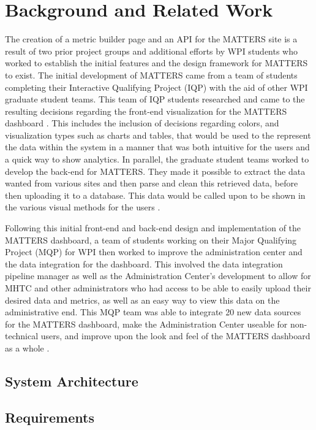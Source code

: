\chapter{Background and Related Work}

The creation of a metric builder page and an API for the MATTERS site is a result of two prior project groups and additional efforts by WPI students who worked to establish the initial features and the design framework for MATTERS to exist. The initial development of MATTERS came from a team of students completing their Interactive Qualifying Project (IQP) with the aid of other WPI graduate student teams. This team of IQP students researched and came to the resulting decisions regarding the front-end visualization for the MATTERS dashboard \cite{prevreport}. This includes the inclusion of decisions regarding colors, and visualization types such as charts and tables, that would be used to the represent the data within the system in a manner that was both intuitive for the users and a quick way to show analytics. In parallel, the graduate student teams worked to develop the back-end for MATTERS. They made it possible to extract the data wanted from various sites and then parse and clean this retrieved data, before then uploading it to a database. This data would be called upon to be shown in the various visual methods for the users \cite{iqp}.

Following this initial front-end and back-end design and implementation of the MATTERS dashboard, a team of students working on their Major Qualifying Project (MQP) for WPI then worked to improve the administration center and the data integration for the dashboard. This involved the data integration pipeline manager as well as the Administration Center’s development to allow for MHTC and other administrators who had access to be able to easily upload their desired data and metrics, as well as an easy way to view this data on the administrative end. This MQP team was able to integrate 20 new data sources for the MATTERS dashboard, make the Administration Center useable for non-technical users, and improve upon the look and feel of the MATTERS dashboard as a whole \cite{iqp}.

\section{System Architecture}

\section{Requirements}

